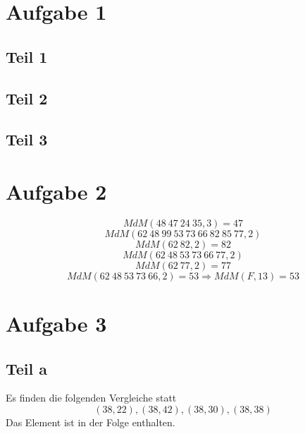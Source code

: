\documentclass[10pt,a4paper]{article}
\begin{document}
\section{Aufgabe 1}

\subsection{Teil 1}

\subsection{Teil 2}

\subsection{Teil 3}

\section{Aufgabe 2}

\begin{equation}
  MdM(48\ 47\ 24\ 35, 3) = 47
\end{equation}
\begin{equation}
  MdM(62\ 48\ 99\ 53\ 73\ 66\ 82\ 85\ 77, 2)
\end{equation}
\begin{equation}
  MdM(62\ 82, 2) = 82
\end{equation}
\begin{equation}
  MdM(62\ 48\ 53\ 73\ 66\ 77, 2)
\end{equation}
\begin{equation}
  MdM(62\ 77, 2) = 77
\end{equation}
\begin{equation}
  MdM(62\ 48\ 53\ 73\ 66, 2) = 53 \Rightarrow MdM(F, 13) = 53
\end{equation}

\section{Aufgabe 3}

\subsection{Teil a}
Es finden die folgenden Vergleiche statt
\begin{equation}
  (38, 22), (38, 42), (38, 30), (38, 38)
\end{equation}
Das Element ist in der Folge enthalten.
\end{document}
